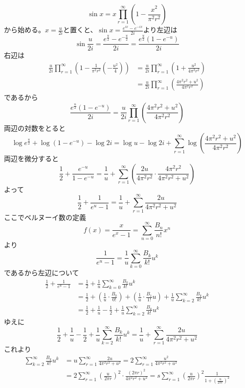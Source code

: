 \documentclass{jsarticle}
\begin{document}
\[\sin x=x\prod_{r=1}^{\infty}\left(1-\frac{x^{2}}{\pi^{2}r^{2}}\right)\]
から始める。\(x=\frac{u}{2i}\)と置くと、\(\sin x=\frac{e^{ix}-e^{-ix}}{2i}\)より左辺は
\[\sin\frac{u}{2i}=\frac{e^{\frac{u}{2}}-e^{-\frac{u}{2}}}{2i}=\frac{e^{\frac{u}{2}}\left(1-e^{-u}\right)}{2i}\]
右辺は
\begin{align*}
\frac{u}{2i}\prod_{r=1}^{\infty}\left(1-\frac{1}{\pi^{2}r^{2}}\left(-\frac{u^2}{4}\right)\right)&=\frac{u}{2i}\prod_{r=1}^{\infty}\left(1+\frac{u^2}{4\pi^{2}r^{2}}\right)\\
&=\frac{u}{2i}\prod_{r=1}^{\infty}\left(\frac{4\pi^{2}r^{2}+u^{2}}{4\pi^{2}r^{2}}\right)
\end{align*}
であるから
\[\frac{e^{\frac{u}{2}}\left(1-e^{-u}\right)}{2i}=\frac{u}{2i}\prod_{r=1}^{\infty}\left(\frac{4\pi^{2}r^{2}+u^{2}}{4\pi^{2}r^{2}}\right)\]
両辺の対数をとると
\[\log e^{\frac{u}{2}}+\log(1-e^{-u})-\log2i=\log u-\log2i+\sum_{r=1}^{\infty}\log\left(\frac{4\pi^{2}r^{2}+u^{2}}{4\pi^{2}r^{2}}\right)\]
両辺を微分すると
\[\frac{1}{2}+\frac{e^{-u}}{1-e^{-u}}=\frac{1}{u}+\sum_{r=1}^{\infty}\left(\frac{2u}{4\pi^{2}r^{2}}\cdot\frac{4\pi^{2}r^{2}}{4\pi^{2}r^{2}+u^2}\right)\]
よって
\[\frac{1}{2}+\frac{1}{e^{u}-1}=\frac{1}{u}+\sum_{r=1}^{\infty}\frac{2u}{4\pi^{2}r^{2}+u^2}\]
ここでベルヌーイ数の定義
\[f(x)=\frac{x}{e^{x}-1}=\sum_{n=0}^{\infty}\frac{B_{n}}{n!}x^n\]
より
\[\frac{1}{e^{u}-1}=\frac{1}{u}\sum_{k=0}^{\infty}\frac{B_{k}}{k!}u^{k}\]
であるから左辺について
\begin{align*}
\frac{1}{2}+\frac{1}{e^{u}-1}&=\frac{1}{2}+\frac{1}{u}\sum_{k=0}^{\infty}\frac{B_{k}}{k!}u^{k}\\
&=\frac{1}{2}+\left(\frac{1}{u}\cdot\frac{B_{0}}{0!}\right)+\left(\frac{1}{u}\cdot\frac{B_{1}}{1!}u\right)+\frac{1}{u}\sum_{k=2}^{\infty}\frac{B_{k}}{k!}u^{k}\\
&=\frac{1}{2}+\frac{1}{u}-\frac{1}{2}+\frac{1}{u}\sum_{k=2}^{\infty}\frac{B_{k}}{k!}u^{k}
\end{align*}
ゆえに
\[\frac{1}{2}+\frac{1}{u}-\frac{1}{2}+\frac{1}{u}\sum_{k=2}^{\infty}\frac{B_{k}}{k!}u^{k}=\frac{1}{u}+\sum_{r=1}^{\infty}\frac{2u}{4\pi^{2}r^{2}+u^2}\]
これより
\begin{align*}
\sum_{k=2}^{\infty}\frac{B_{k}}{k!}u^{k}&=u\sum_{r=1}^{\infty}\frac{2u}{4\pi^{2}r^{2}+u^2}=2\sum_{r=1}^{\infty}\frac{u^2}{4\pi^{2}r^{2}+u^2}\\
&=2\sum_{r=1}^{\infty}\left(\frac{u}{2\pi r}\right)^2\cdot\frac{(2\pi r)^2}{4\pi^{2}r^{2}+u^2}=s\sum_{r=1}^{\infty}\left(\frac{u}{2\pi r}\right)^2\frac{1}{1+\left(\frac{u}{2\pi r}\right)^2}
\end{align*}
\end{document}
